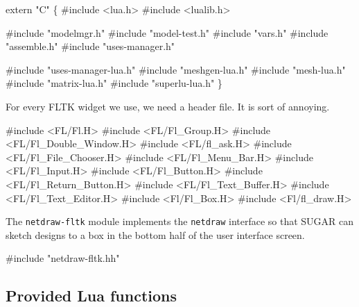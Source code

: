 extern "C" \{
#include <lua.h>
#include <lualib.h>

#include "modelmgr.h"
#include "model-test.h"
#include "vars.h"
#include "assemble.h"
#include "uses-manager.h"

#include "uses-manager-lua.h"
#include "meshgen-lua.h"
#include "mesh-lua.h"
#include "matrix-lua.h"
#include "superlu-lua.h"
\}

\nwendcode{}\nwdocspar

For every FLTK widget we use, we need a header file.  It is sort
of annoying.

\nwenddocs{}\plusendmoddef
#include <FL/Fl.H>
#include <FL/Fl_Group.H>
#include <FL/Fl_Double_Window.H>
#include <FL/fl_ask.H>
#include <FL/Fl_File_Chooser.H>
#include <FL/Fl_Menu_Bar.H>
#include <FL/Fl_Input.H>
#include <FL/Fl_Button.H>
#include <FL/Fl_Return_Button.H>
#include <FL/Fl_Text_Buffer.H>
#include <FL/Fl_Text_Editor.H>
#include <Fl/Fl_Box.H>
#include <Fl/fl_draw.H>

\nwendcode{}\nwdocspar

The {\tt{}netdraw-fltk} module implements the {\tt{}netdraw} interface
so that SUGAR can sketch designs to a box in the bottom half of
the user interface screen.

\nwenddocs{}\plusendmoddef
#include "netdraw-fltk.hh"

\nwendcode{}\nwdocspar


\subsection{Provided Lua functions}

